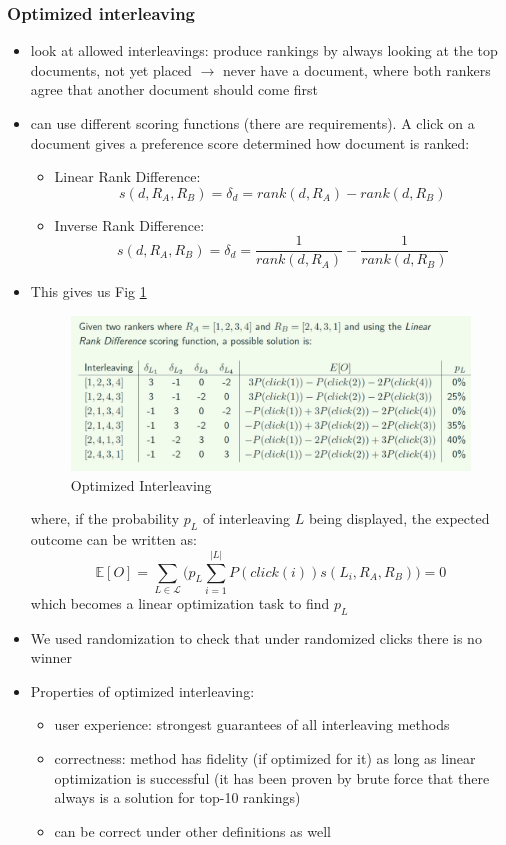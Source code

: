 \subsubsection{Optimized interleaving}
\begin{itemize}
	\item look at allowed interleavings: produce rankings by always looking at the top documents, not yet placed $\rightarrow$ never have a document, where both rankers agree that another document should come first
	\item can use different scoring functions (there are requirements). A click on a document gives a preference score determined how document is ranked:
	\begin{itemize}
		\item Linear Rank Difference:
		$$s(d,R_A,R_B) = \delta_d = rank(d,R_A) - rank(d, R_B)$$
		\item Inverse Rank Difference:
		$$s(d,R_A,R_B) = \delta_d = \dfrac{1}{rank(d,R_A)} - \dfrac{1}{rank(d, R_B)}$$
	\end{itemize}
	\item This gives us Fig \ref{img:optimized_interleaving}
	\begin{figure}[h!]
		\centering
		\includegraphics[width=\textwidth]{figures/optimized_interleaving.png}
		\caption{Optimized Interleaving}
		\label{img:optimized_interleaving}
	\end{figure}
	where, if the probability $p_L$ of interleaving $L$ being displayed, the expected outcome can be written as:
	$$\mathbb{E}[O] = \sum_{L \in \mathcal{L}} \Big( p_L \sum_{i=1}^{|L|} P(click(i))s(L_i,R_A,R_B) \Big) = 0$$
	which becomes a linear optimization task to find $p_L$
	\item We used randomization to check that under randomized clicks there is no winner
	\item Properties of optimized interleaving:
	\begin{itemize}
		\item user experience: strongest guarantees of all interleaving methods
		\item correctness: method has fidelity (if optimized for it) as long as linear optimization is successful (it has been proven by brute force that there always is a solution for top-10 rankings)
		\item can be correct under other definitions as well
	\end{itemize}
\end{itemize}
